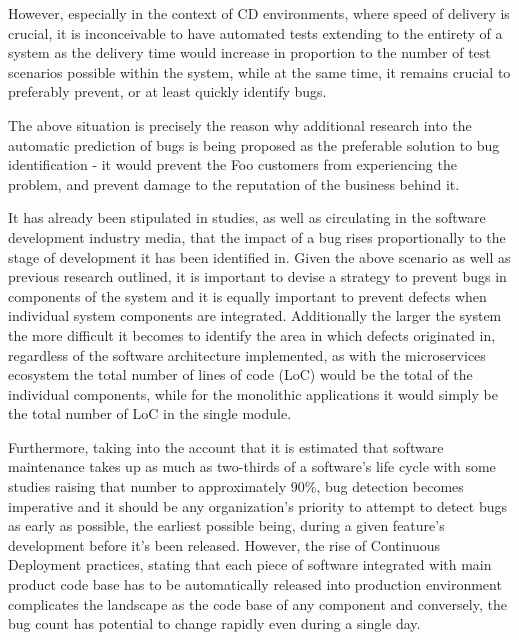 However, especially in the context of CD environments, where speed of delivery is crucial, it is inconceivable to have automated tests extending to the entirety of a system as the delivery time would increase in proportion to the number of test scenarios possible within the system\cite{softwareTestingChallenges}, while at the same time, it remains crucial to preferably prevent, or at least quickly identify bugs. 

The above situation is precisely the reason why additional research into the automatic prediction of bugs is being proposed as the preferable solution to bug identification - it would prevent the Foo customers from experiencing the problem, and prevent damage to the reputation of the business behind it.

It has already been stipulated in studies\cite{autoDetectionOfPerfBugs}, as well as circulating in the software development industry media\cite{costOfBugInRelationToDevelopmentPhase}, that the impact of a bug rises proportionally to the stage of development it has been identified in.
Given the above scenario as well as previous research outlined\cite{bugDetectionInParticleSwarm}, it is important to devise a strategy to prevent bugs in components of the system and it is equally important to prevent defects when individual system components are integrated. Additionally the larger the system the more difficult it becomes to identify the area in which defects originated in\cite{Zhou_2012_whereShouldBugsBeFixed}, regardless of the software architecture implemented, as with the microservices ecosystem the total number of lines of code (LoC) would be the total of the individual components, while for the monolithic applications it would simply be the total number of LoC in the single module. 

Furthermore, taking into the account that it is estimated that software maintenance takes up as much as two-thirds of a software's life cycle\cite{duplicateBugDetection} with some studies raising that number to approximately 90\%\cite{reopenedBugsAndMaintenence}, bug detection becomes imperative and it should be any organization's priority to attempt to detect bugs as early as possible, the earliest possible being, during a given feature's development before it's been released. However, the rise of Continuous Deployment practices, stating that each piece of software integrated with main product code base has to be automatically released into production environment complicates the landscape as the code base of any component and conversely, the bug count has potential to change rapidly even during a single day.

